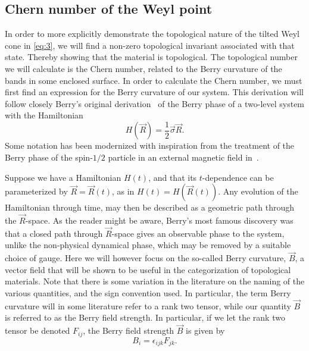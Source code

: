 \subsection{Chern number of the Weyl point}\label{sec:chern-number-weyl}
In order to more explicitly demonstrate the topological nature of the tilted Weyl cone in \cref{eq:3}, we will find a non-zero topological invariant associated with that state.
Thereby showing that the material is topological.
The topological number we will calculate is the Chern number, related to the Berry curvature of the bands in some enclosed surface.
In order to calculate the Chern number, we must first find an expression for the Berry curvature of our system.
This derivation will follow closely Berry's original derivation~\cite{berryQuantalPhaseFactors1984} of the Berry phase of a two-level system with the Hamiltonian
\begin{equation}
  \label{eq:6}
  H(\vec{R}) = \frac12 \vec\sigma \vec{R}.
\end{equation}
Some notation has been modernized with inspiration from the treatment of the Berry phase of the spin-$1 /2$ particle in an external magnetic field in~\textcite{holsteinAdiabaticTheoremBerry1989}.

Suppose we have a Hamiltonian $H(t)$, and that its $t$-dependence can be parameterized by $\vec{R} = \vec{R}(t)$, as in $H(t) = H(\vec{R}(t))$.
Any evolution of the Hamiltonian through time, may then be described as a geometric path through the $\vec{R}$-space.
As the reader might be aware, Berry's most famous discovery was that a closed path through $\vec{R}$-space gives an observable phase to the system, unlike the non-physical dynamical phase, which may be removed by a suitable choice of gauge.
Here we will however focus on the so-called Berry curvature, $\vec{B}$, a vector field that will be shown to be useful in the categorization of topological materials.
Note that there is some variation in the literature on the naming of the various quantities, and the sign convention used.
In particular, the term Berry curvature will in some literature refer to a rank two tensor, while our quantity $\vec{B}$ is referred to as the Berry field strength.
In particular, if we let the rank two tensor be denoted $F_{ij}$, the Berry field strength $\vec{B}$ is given by
\begin{equation}
  B_i = \epsilon_{ijk} F_{jk}.
\end{equation}

